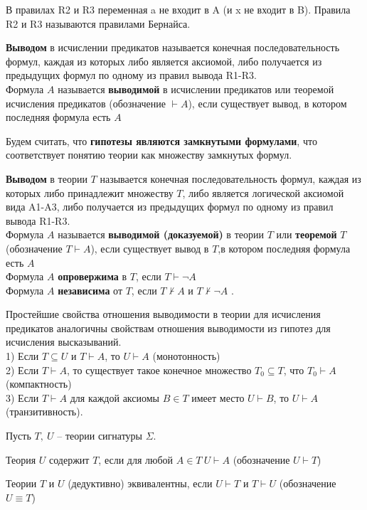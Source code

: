 В правилах R2 и R3 переменная a не входит в A (и x не входит в B). Правила R2 и R3 называются правилами Бернайса.
\begin{definition}
	\textbf{Выводом} в исчислении предикатов называется конечная
	последовательность формул, каждая из которых либо является аксиомой, либо получается из предыдущих формул по
	одному из правил вывода R1-R3.\\
	Формула $A$ называется \textbf{выводимой} в исчислении предикатов или теоремой исчисления предикатов
	(обозначение $\vdash A$), если существует вывод, в котором последняя формула есть $A$ \label{formula9}
\end{definition}
Будем считать, что \textbf{гипотезы являются замкнутыми формулами}, что соответствует понятию теории как множеству
замкнутых формул.
\begin{definition}
	\textbf{Выводом} в теории $T$ называется конечная последовательность формул, каждая из которых либо принадлежит
	множеству $T$, либо является логической аксиомой вида A1-A3, либо получается из предыдущих формул по одному из
	правил вывода R1-R3.\\
	Формула $A$ называется \textbf{выводимой (доказуемой)} в теории $T$ или \textbf{теоремой} $T$ (обозначение $T
	\vdash A$), если существует вывод в $T$,в котором последняя формула есть $A$ \label{formula10} \\ 
	Формула $A$ \textbf{опровержима} в $T$, если $T \vdash \neg A$\\
	Формула $A$ \textbf{независима} от $T$, если $T \nvdash A$ и $T \nvdash \neg A$ .
\end{definition}
Простейшие свойства отношения выводимости в теории для исчисления предикатов аналогичны свойствам отношения
выводимости из гипотез для исчисления высказываний.\\
1) Если $T \subseteq U$ и $T \vdash A$, то $U \vdash A$ (монотонность)\\
2) Если $T \vdash A$, то существует такое конечное множество $T_0 \subseteq T$, что $T_0 \vdash A$ (компактность)\\
3) Если $T \vdash A$ для каждой аксиомы $B \in T$ имеет место $U \vdash B$, то $U \vdash A$ (транзитивность).
\begin{definition}
	Пусть $T, \ U$ -- теории сигнатуры $\Sigma$.

	Теория $U$ содержит $T$, если для любой $A\in T\: U \vdash A$ (обозначение $U \vdash T$)\label{formula11}

	Теории $T$ и $U$ (дедуктивно) эквивалентны, если   $U \vdash T$ и $T \vdash U$ (обозначение $U \equiv
	T$) \label{formula12}
\end{definition}
